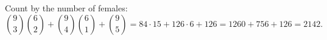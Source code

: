 Count by the number of females:
\[\binom93\binom62+\binom94\binom61+\binom95=84\cdot15+126\cdot6+126=1260+756+126=\boxed{2142}.\]
